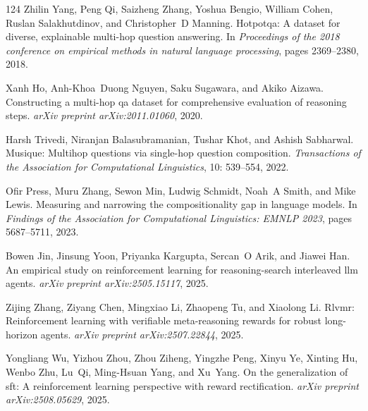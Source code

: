 \documentclass[]{youtu} %
\begin{document}
\begin{thebibliography}{124}
Zhilin Yang, Peng Qi, Saizheng Zhang, Yoshua Bengio, William Cohen, Ruslan Salakhutdinov, and Christopher~D Manning.
\newblock Hotpotqa: A dataset for diverse, explainable multi-hop question answering.
\newblock In \emph{Proceedings of the 2018 conference on empirical methods in natural language processing}, pages 2369--2380, 2018.

Xanh Ho, Anh-Khoa~Duong Nguyen, Saku Sugawara, and Akiko Aizawa.
\newblock Constructing a multi-hop qa dataset for comprehensive evaluation of reasoning steps.
\newblock \emph{arXiv preprint arXiv:2011.01060}, 2020.

Harsh Trivedi, Niranjan Balasubramanian, Tushar Khot, and Ashish Sabharwal.
\newblock Musique: Multihop questions via single-hop question composition.
\newblock \emph{Transactions of the Association for Computational Linguistics}, 10: 539--554, 2022.

Ofir Press, Muru Zhang, Sewon Min, Ludwig Schmidt, Noah~A Smith, and Mike Lewis.
\newblock Measuring and narrowing the compositionality gap in language models.
\newblock In \emph{Findings of the Association for Computational Linguistics: EMNLP 2023}, pages 5687--5711, 2023.

Bowen Jin, Jinsung Yoon, Priyanka Kargupta, Sercan~O Arik, and Jiawei Han.
\newblock An empirical study on reinforcement learning for reasoning-search interleaved llm agents.
\newblock \emph{arXiv preprint arXiv:2505.15117}, 2025{}.

Zijing Zhang, Ziyang Chen, Mingxiao Li, Zhaopeng Tu, and Xiaolong Li.
\newblock Rlvmr: Reinforcement learning with verifiable meta-reasoning rewards for robust long-horizon agents.
\newblock \emph{arXiv preprint arXiv:2507.22844}, 2025{}.

Yongliang Wu, Yizhou Zhou, Zhou Ziheng, Yingzhe Peng, Xinyu Ye, Xinting Hu, Wenbo Zhu, Lu~Qi, Ming-Hsuan Yang, and Xu~Yang.
\newblock On the generalization of sft: A reinforcement learning perspective with reward rectification.
\newblock \emph{arXiv preprint arXiv:2508.05629}, 2025.


\end{thebibliography}
\end{document}
